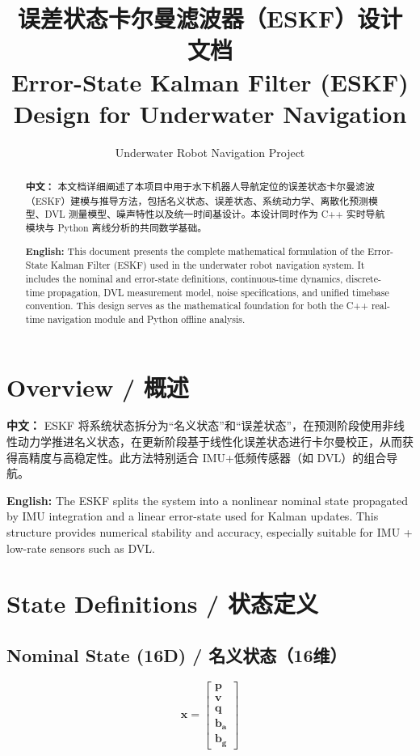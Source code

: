\documentclass[12pt,a4paper]{ctexart} %
\title{%
\textbf{误差状态卡尔曼滤波器（ESKF）设计文档}\\[0.2cm]
\large Error-State Kalman Filter (ESKF) Design for Underwater Navigation
}
\author{Underwater Robot Navigation Project}
\date{}
\begin{document}
\maketitle

\begin{abstract}
\textbf{中文：}  
本文档详细阐述了本项目中用于水下机器人导航定位的误差状态卡尔曼滤波（ESKF）建模与推导方法，包括名义状态、误差状态、系统动力学、离散化预测模型、DVL 测量模型、噪声特性以及统一时间基设计。本设计同时作为 C++ 实时导航模块与 Python 离线分析的共同数学基础。

\textbf{English:}  
This document presents the complete mathematical formulation of the 
Error-State Kalman Filter (ESKF) used in the underwater robot navigation 
system. It includes the nominal and error-state definitions, 
continuous-time dynamics, discrete-time propagation, DVL measurement 
model, noise specifications, and unified timebase convention. 
This design serves as the mathematical foundation for both the C++ 
real-time navigation module and Python offline analysis.
\end{abstract}

\section{Overview / 概述}

\textbf{中文：}  
ESKF 将系统状态拆分为“名义状态”和“误差状态”，在预测阶段使用非线性动力学推进名义状态，在更新阶段基于线性化误差状态进行卡尔曼校正，从而获得高精度与高稳定性。此方法特别适合 IMU+低频传感器（如 DVL）的组合导航。

\textbf{English:}  
The ESKF splits the system into a nonlinear nominal state propagated by 
IMU integration and a linear error-state used for Kalman updates. 
This structure provides numerical stability and accuracy, 
especially suitable for IMU + low-rate sensors such as DVL.

\section{State Definitions / 状态定义}

\subsection{Nominal State (16D) / 名义状态（16维）}

\[
\mathbf{x} =
\begin{bmatrix}
\mathbf{p} \\
\mathbf{v} \\
\mathbf{q} \\
\mathbf{b_a} \\
\mathbf{b_g}
\end{bmatrix}
\]
\end{document}
